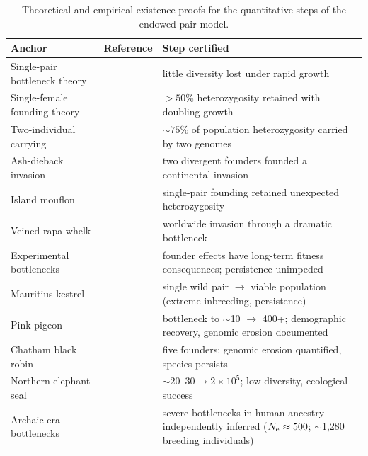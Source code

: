 \begin{table}[t]
\centering\small
\caption{Theoretical and empirical existence proofs for the quantitative
steps of the endowed-pair model.}
\label{tab:anchors}
\begin{tabular}{p{3.6cm}p{4.0cm}p{7.6cm}}
\toprule
Anchor & Reference & Step certified \\
\midrule
Single-pair bottleneck theory & \citet{Nei1975} & little diversity lost under rapid growth \\
Single-female founding theory & \citet{BartonCharlesworth1984} & $>50\%$ heterozygosity retained with doubling growth \\
Two-individual carrying & \citet{SlatkinExcoffier2012} & $\sim75\%$ of population heterozygosity carried by two genomes \\
Ash-dieback invasion & \citet{McMullan2018} & two divergent founders founded a continental invasion \\
Island mouflon & \citet{Kaeuffer2007} & single-pair founding retained unexpected heterozygosity \\
Veined rapa whelk & \citet{Xue2018} & worldwide invasion through a dramatic bottleneck \\
Experimental bottlenecks & \citet{Szucs2017} & founder effects have long-term fitness consequences; persistence unimpeded \\
Mauritius kestrel & \citet{Ewing2008} & single wild pair $\to$ viable population (extreme inbreeding, persistence) \\
Pink pigeon & \citet{Jackson2022} & bottleneck to $\sim$10 $\to$ 400+; demographic recovery, genomic erosion documented \\
Chatham black robin & \citet{vonSeth2022} & five founders; genomic erosion quantified, species persists \\
Northern elephant seal & \citet{Hoelzel2024} & $\sim20$--$30 \to 2\times10^5$; low diversity, ecological success \\
Archaic-era bottlenecks & \citet{Rogers2020,Hu2023} & severe bottlenecks in human ancestry independently inferred ($N_{\mathrm{e}}\approx500$; $\sim$1,280 breeding individuals) \\
\bottomrule
\end{tabular}
\end{table}

